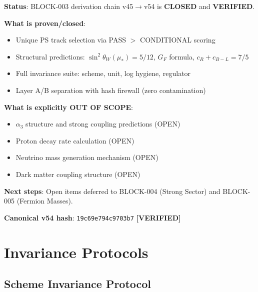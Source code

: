 \documentclass[11pt,a4paper]{article}
\begin{document}
\begin{closurebox}
\label{box:block003-closed}
\textbf{Status}: BLOCK-003 derivation chain v45$\to$v54 is \textbf{CLOSED} and \textbf{VERIFIED}.

\textbf{What is proven/closed}:
\begin{itemize}
    \item Unique PS track selection via PASS $>$ CONDITIONAL scoring
    \item Structural predictions: $\sin^2\theta_W(\mu_*) = 5/12$, $G_F$ formula, $c_R + c_{B-L} = 7/5$
    \item Full invariance suite: scheme, unit, log hygiene, regulator
    \item Layer A/B separation with hash firewall (zero contamination)
\end{itemize}

\textbf{What is explicitly OUT OF SCOPE}:
\begin{itemize}
    \item $\alpha_3$ structure and strong coupling predictions (OPEN)
    \item Proton decay rate calculation (OPEN)
    \item Neutrino mass generation mechanism (OPEN)
    \item Dark matter coupling structure (OPEN)
\end{itemize}

\textbf{Next steps}: Open items deferred to BLOCK-004 (Strong Sector) and BLOCK-005 (Fermion Masses).

\textbf{Canonical v54 hash}: \texttt{19c69e794c9703b7} \textbf{[VERIFIED]}
\end{closurebox}

\appendix
\section{Invariance Protocols}
\label{app:invariance}

\subsection{Scheme Invariance Protocol}
\label{app:scheme-inv}
\end{document}
